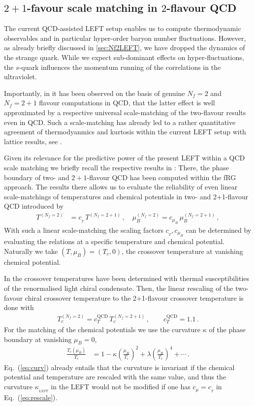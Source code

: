 \documentclass[%
reprint,
superscriptaddress,
showpacs,preprintnumbers,
amsmath,amssymb,
aps,
prd,
]{revtex4-1}
\def\Eq#1{Eq.~(\ref{#1})}
\begin{document}
	\subsection{$2+1$-favour scale matching in $2$-flavour QCD}
	\label{subsec:scale}
	
	The current QCD-assisted LEFT setup enables us to compute thermodynamic observables and in particular hyper-order baryon number fluctuations. However, as already briefly discussed in \autoref{sec:Nf2LEFT}, we have dropped the dynamics of the strange quark. While we expect sub-dominant effects on hyper-fluctuations, the $s$-quark influences the momentum running of the correlations in the ultraviolet. 
	
	Importantly, in \cite{Fu:2019hdw} it has been observed on the basis of genuine $N_f=2$ and $N_f=2+1$ flavour computations in QCD, that the latter effect is well approximated by a respective universal scale-matching of the two-flavour results even in QCD. Such a scale-matching has already led to a rather quantitative agreement of thermodyanmics and kurtosis within the current LEFT setup with lattice results, see \cite{Fu:2015amv, Fu:2015naa, Fu:2016tey}. 
	
	
	Given its relevance for the predictive power of the present LEFT within a QCD scale matching we briefly recall the respective results in \cite{Fu:2019hdw}: There, the phase boundary of two- and $2+1$-flavour QCD has been computed within the fRG approach. The results there allows us to evaluate the reliability of even linear scale-matchings of temperatures and chemical potentials in two- and 2+1-flavour QCD introduced by 
	\begin{align}
		T^{(N_f=2)} &=c_{_{T}}\,T^{(N_f=2+1)} \,, \quad \mu_B^{(N_f=2)} =c_{\mu_B}\,\mu_{B}^{(N_f=2+1)} \,,\label{eq:rescale}
	\end{align}
	With such a linear scale-matching the scaling factors $c_{_{T}}, c_{\mu_B}$ can be determined by evaluating the relations at a specific temperature and chemical potential. Naturally we take $(T,\mu_B)=(T_c,0)$, the crossover temperature at vanishing chemical potential. 
	
	In \cite{Fu:2019hdw} the crossover temperatures have been determined with thermal susceptibilities of the renormalised light chiral condensate. Then, the linear rescaling of the two-favour chiral crossover temperature to the 2+1-flavour crossover temperature is done with 
	\begin{align}\label{eq:cTQCD}
		T_c^{(N_f=2)} = c_T^{\textrm{QCD}}\, T_c^{(N_f=2+1)}\,, \qquad  c_T^{\textrm{QCD}}=1.1\,. 
	\end{align} 
	For the matching of the chemical potentials we use the curvature $\kappa$ of the phase boundary at vanishing $\mu_B=0$, 
	\begin{align}
		\frac{T_c(\mu_B)}{T_c}&=1-\kappa \left(\frac{\mu_B}{T_c}\right)^2+\lambda \left(\frac{\mu_B}{T_c}\right)^4+\cdots\,.\label{eq:curv}
	\end{align}
	\Eq{eq:curv} already entails that the curvature is invariant if the chemical potential and temperature are rescaled with the same value, and thus the curvature $\kappa_{_{LEFT}}$ in the LEFT would not be modified if one has $c_{\mu}=c_{_{T}}$ in \Eq{eq:rescale}. 
	
\end{document}
